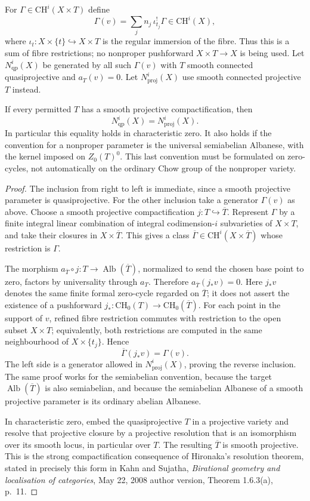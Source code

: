 \documentclass[11pt,a4paper]{article}
\theoremstyle{definition}\newtheorem{definition}[theorem]{Definition}
\theoremstyle{remark}\newtheorem{remark}[theorem]{Remark}
\begin{document}
For $\Gamma\in\mathrm{CH}^i(X\times T)$ define
\[
 \Gamma(v)=\sum_j n_j\,\iota_{t_j}^{!}\Gamma
                         \in\mathrm{CH}^i(X),
\]
where $\iota_t:X\times\{t\}\hookrightarrow X\times T$
is the regular immersion of the fibre. Thus this is a
sum of fibre restrictions; no nonproper pushforward
$X\times T\to X$ is being used. Let $N^i_{\mathrm{qp}}(X)$
be generated by all such $\Gamma(v)$ with $T$ smooth connected
quasiprojective and $a_T(v)=0$. Let $N^i_{\mathrm{proj}}(X)$
use smooth connected projective $T$ instead.

If every permitted $T$ has a smooth projective compactification,
then
\[
 N^i_{\mathrm{qp}}(X)=N^i_{\mathrm{proj}}(X).                 \tag{AQ.14.1}
\]
In particular this equality holds in characteristic zero.
It also holds if the convention for a nonproper parameter is
the universal semiabelian Albanese, with the kernel imposed
on $Z_0(T)^0$. This last convention must be formulated on
zero-cycles, not automatically on the ordinary Chow group
of the nonproper variety.

\begin{proof}
The inclusion from right to left is immediate, since a
smooth projective parameter is quasiprojective. For the
other inclusion take a generator $\Gamma(v)$ as above.
Choose a smooth projective compactification
$j:T\hookrightarrow\overline T$. Represent $\Gamma$ by
a finite integral linear combination of integral
codimension-$i$ subvarieties of $X\times T$, and take
their closures in $X\times\overline T$. This gives a class
$\overline\Gamma\in\mathrm{CH}^i(X\times\overline T)$
whose restriction is $\Gamma$.

The morphism $a_{\overline T}\circ j:T\to
\operatorname{Alb}(\overline T)$, normalized to send the
chosen base point to zero, factors by universality through
$a_T$. Therefore
$a_{\overline T}(j_*v)=0$. Here $j_*v$ denotes the same
finite formal zero-cycle regarded on $\overline T$;
it does not assert the existence of a pushforward
$j_*:\mathrm{CH}_0(T)\to\mathrm{CH}_0(\overline T)$.
For each point in the support of $v$, refined fibre
restriction commutes with restriction to the open subset
$X\times T$; equivalently, both restrictions are computed
in the same neighbourhood of $X\times\{t_j\}$. Hence
\[
 \overline\Gamma(j_*v)=\Gamma(v).
\]
The left side is a generator allowed in
$N^i_{\mathrm{proj}}(X)$, proving the reverse inclusion.
The same proof works for the semiabelian convention,
because the target $\operatorname{Alb}(\overline T)$ is
also semiabelian, and because the semiabelian Albanese
of a smooth projective parameter is its ordinary
abelian Albanese.

In characteristic zero, embed the quasiprojective $T$
in a projective variety and resolve that projective
closure by a projective resolution that is an
isomorphism over its smooth locus, in particular over
$T$. The resulting $\overline T$ is smooth projective.
This is the strong compactification consequence of
Hironaka's resolution theorem, stated in precisely
this form in Kahn and Sujatha, \emph{Birational geometry
and localisation of categories}, May 22, 2008 author
version, Theorem 1.6.3(a), p.~11.
\end{proof}
\end{document}
